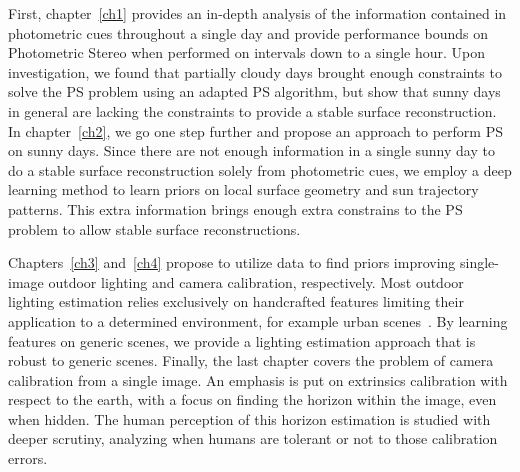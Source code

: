 First, chapter~\ref{ch1} provides an in-depth analysis of the information contained in photometric cues throughout a single day and provide performance bounds on Photometric Stereo when performed on intervals down to a single hour. Upon investigation, we found that partially cloudy days brought enough constraints to solve the PS problem using an adapted PS algorithm, but show that sunny days in general are lacking the constraints to provide a stable surface reconstruction. In chapter~\ref{ch2}, we go one step further and propose an approach to perform PS on sunny days. Since there are not enough information in a single sunny day to do a stable surface reconstruction solely from photometric cues, we employ a deep learning method to learn priors on local surface geometry and sun trajectory patterns. This extra information brings enough extra constrains to the PS problem to allow stable surface reconstructions.

Chapters~\ref{ch3} and~\ref{ch4} propose to utilize data to find priors improving single-image outdoor lighting and camera calibration, respectively. Most outdoor lighting estimation relies exclusively on handcrafted features limiting their application to a determined environment, for example urban scenes~\cite{lalonde-ijcv-12}. By learning features on generic scenes, we provide a lighting estimation approach that is robust to generic scenes. Finally, the last chapter covers the problem of camera calibration from a single image. An emphasis is put on extrinsics calibration with respect to the earth, with a focus on finding the horizon within the image, even when hidden. The human perception of this horizon estimation is studied with deeper scrutiny, analyzing when humans are tolerant or not to those calibration errors.

